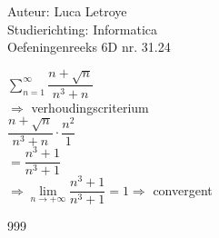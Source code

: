 \documentclass[a4paper]{article}
\begin{document}
  
\noindent \large Auteur: Luca Letroye \\
\noindent \large Studierichting: Informatica\\
\noindent \large Oefeningenreeks 6D nr. 31.24

\medskip
\normalsize

$ \displaystyle\sum_{n=1}^{\infty} \dfrac{n+\sqrt{n}}{n^3+n} $\\

$\Rightarrow $ verhoudingscriterium\\

$\dfrac{n+\sqrt{n}}{n^3+n}\cdot \dfrac{n^2}{1}$\\

$= \dfrac{n^3+1}{n^3+1}$\\

$\Rightarrow \lim\limits_{n\rightarrow +\infty} \dfrac{n^3+1}{n^3+1}  = 1 \Rightarrow $ convergent\\






\begin{thebibliography}{999}
\end{thebibliography}
\end{document}
